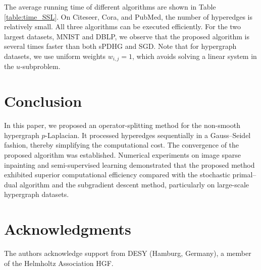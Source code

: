 \documentclass{article}
\theoremstyle{definition}
\begin{document}
The average running time of different algorithms are shown in Table \ref{table:time_SSL}.
On Citeseer, Cora, and PubMed, the number of hyperedges is relatively small. All three algorithms can be executed efficiently.
For the two largest datasets, MNIST and DBLP, we observe that the proposed algorithm is several times faster than both sPDHG and SGD.
Note that for hypergraph datasets, we use uniform weights $w_{i,j} = 1$, which avoids solving a linear system in the $u$-subproblem.


\section{Conclusion}
In this paper, we proposed an operator-splitting method for the non-smooth hypergraph $p$-Laplacian.
It processed hyperedges sequentially in a Gauss–Seidel fashion, thereby simplifying the computational cost.
The convergence of the proposed algorithm was established.
Numerical experiments on image sparse inpainting and semi-supervised learning demonstrated that the proposed method exhibited superior computational efficiency compared with the stochastic primal–dual algorithm and the subgradient descent method, particularly on large-scale hypergraph datasets.



\section*{Acknowledgments}
The authors acknowledge support from DESY (Hamburg, Germany), a member of the Helmholtz Association HGF.











%
%



\end{document}
